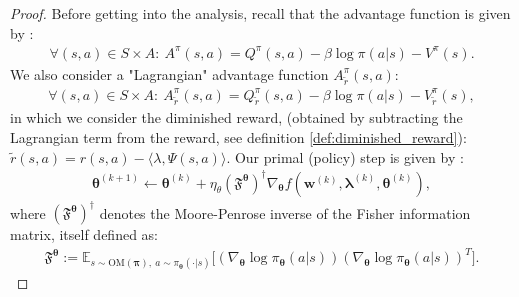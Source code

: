 \begin{proof}
    
Before getting into the analysis, recall that the advantage function is given by : 
\begin{align*}
    \forall (s,a) \in S \times A : ~ A^\pi(s,a) = Q^\pi(s,a) - \beta \log \pi(a|s) - V^\pi(s).
\end{align*}
We also consider a "Lagrangian" advantage function $A^\pi_{\tilde{r}}(s,a)$:
\begin{align}
    \label{eq:adv_function}
    \forall (s,a) \in S \times A : ~ A_{\tilde{r}}^\pi(s,a) = Q_{\tilde{r}}^\pi(s,a) - \beta \log \pi(a|s) - V_{\tilde{r}}^\pi(s),
\end{align}
in which we consider the diminished reward, (obtained by subtracting the Lagrangian term from the reward, see definition \ref{def:diminished_reward}): $\tilde{r}(s,a) = r(s,a) - \langle \lambda, \Psi(s,a) \rangle$.
Our primal (policy) step is given by : 
\begin{align*}
    \bm{\theta}^{(k+1)} 
    \leftarrow  \bm{\theta}^{(k)} 
    + \eta_\theta 
    (\mathfrak{F}^{\bm{\theta}})^\dagger
    \nabla_{\bm{\theta}} 
    f(\bm{w}^{(k)},\bm{\lambda}^{(k)},\bm{\theta}^{(k)}),\tag{S}
\end{align*}
where $(\mathfrak{F}^{\bm{\theta}})^\dagger$ denotes the Moore-Penrose inverse of the Fisher information matrix, itself defined as:
\begin{align*}
    \mathfrak{F}^{\bm{\theta}}
    := \mathbb{E}_{
        s \sim \text{OM}(\bm{\pi}), ~
        a \sim \pi_{\bm{\theta}}(\cdot|s)
    }\Big[
        (\nabla_{\bm{\theta}} \log \pi_{\bm{\theta}} (a|s))
        (\nabla_{\bm{\theta}} \log \pi_{\bm{\theta}} (a|s))^T
    \Big].
\end{align*}


\end{proof}
